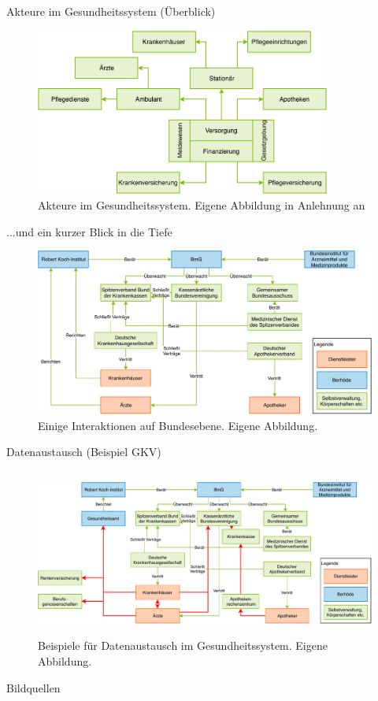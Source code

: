 \documentclass[aspectratio=169,t]{beamer}
\begin{document}
\begin{frame}{Akteure im Gesundheitssystem (Überblick)}
   \begin{figure}[h!]
    \includegraphics[height=5.5cm]{Bilder/Gesundheitssystem.pdf}
     \caption{Akteure im Gesundheitssystem. Eigene Abbildung in Anlehnung an \cite{SmartHealth}}
   \end{figure}
\end{frame}

\begin{frame}{...und ein kurzer Blick in die Tiefe}
   \begin{figure}[h!]
    \includegraphics[height=5.5cm, right]{Bilder/GesundheitssystemAkteureBund.pdf}
     \caption{Einige Interaktionen auf Bundesebene. Eigene Abbildung.}
   \end{figure}
\end{frame}

\begin{frame}{Datenaustausch (Beispiel GKV)}
   \begin{figure}[h!]
    \includegraphics[height=5.5cm, right]{Bilder/DatenfluesseGesundheitssystem.pdf}
     \caption{Beispiele für Datenaustausch im Gesundheitssystem. Eigene Abbildung.}
   \end{figure}
\end{frame}


\begin{frame}{Bildquellen}
\printbibliography
\end{frame}
\end{document}
